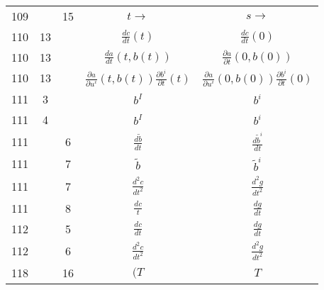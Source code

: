 \documentclass[a4paper,11pt]{article}
\begin{document}
\begin{center}
\begin{tabular}{|c|c|c|c|c|}
    109 & & 15 & $t \to$ & $s \to$ \\
    110 & 13 & & $\frac{ d c }{ dt }( t )$
           & $\frac{ d c }{ dt }( 0 )$ \\
    110 & 13 & & $\frac{ d a }{ dt }( t, b( t ) )$
           & $\frac{ \partial a }{ \partial t }( 0, b( 0 ) )$ \\
    110 & 13 & & $\frac{ \partial a }{ \partial u^{ i } }( t, b( t ) )
                 \frac{ \partial b^{ i } }{ \partial t }( t )$
           & $\frac{ \partial a }{ \partial u^{ i } }( 0, b( 0 ) )
             \frac{ \partial b^{ i } }{ \partial t }( 0 )$ \\
    111 & \hphantom{0}3 & & $b^{ I }$ & $b^{ i }$ \\
    111 & \hphantom{0}4 & & $b^{ I }$ & $b^{ i }$ \\
    111 & & \hphantom{0}6 & $\frac{ d \widetilde{ b } }{ dt }$
    & $\frac{ d \widetilde{ b }^{ i } }{ dt }$ \\
    111 & & \hphantom{0}7 & $\widetilde{ b }$ & $\widetilde{ b }^{ i }$ \\
    111 & & \hphantom{0}7 & $\frac{ d^{ 2 } c }{ dt^{ 2 } }$
    & $\frac{ d^{ 2 } g }{ dt^{ 2 } }$ \\
    111 & & \hphantom{0}8 & $\frac{ d c }{ t }$ & $\frac{ d g }{ dt }$ \\
    112 & & \hphantom{0}5 & $\frac{ d c }{ dt }$ & $\frac{ d g }{ dt }$ \\
    112 & & \hphantom{0}6 & $\frac{ d^{ 2 } c }{ dt^{ 2 } }$
           & $\frac{ d^{ 2 } g }{ dt^{ 2 } }$ \\
    118 & & 16 & $( T$ & $T$ \\
    \hline
  \end{tabular}





  \newpage


\end{center}
\end{document}
